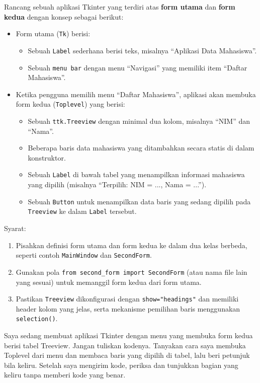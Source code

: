 Rancang sebuah aplikasi Tkinter yang terdiri atas \textbf{form utama} dan \textbf{form kedua} dengan konsep sebagai berikut:
\begin{itemize}
    \item Form utama (\texttt{Tk}) berisi:
          \begin{itemize}
              \item Sebuah \texttt{Label} sederhana berisi teks, misalnya ``Aplikasi Data Mahasiswa''.
              \item Sebuah \texttt{menu bar} dengan menu ``Navigasi'' yang memiliki item ``Daftar Mahasiswa''.
          \end{itemize}
    \item Ketika pengguna memilih menu ``Daftar Mahasiswa'', aplikasi akan membuka form kedua (\texttt{Toplevel}) yang berisi:
          \begin{itemize}
              \item Sebuah \texttt{ttk.Treeview} dengan minimal dua kolom, misalnya ``NIM'' dan ``Nama''.
              \item Beberapa baris data mahasiswa yang ditambahkan secara statis di dalam konstruktor.
              \item Sebuah \texttt{Label} di bawah tabel yang menampilkan informasi mahasiswa yang dipilih (misalnya ``Terpilih: NIM = ..., Nama = ...'').
              \item Sebuah \texttt{Button} untuk menampilkan data baris yang sedang dipilih pada \texttt{Treeview} ke dalam \texttt{Label} tersebut.
          \end{itemize}
\end{itemize}
Syarat:
\begin{enumerate}
    \item Pisahkan definisi form utama dan form kedua ke dalam dua kelas berbeda, seperti contoh \texttt{MainWindow} dan \texttt{SecondForm}.
    \item Gunakan pola \texttt{from second\_form import SecondForm} (atau nama file lain yang sesuai) untuk memanggil form kedua dari form utama.
    \item Pastikan \texttt{Treeview} dikonfigurasi dengan \texttt{show="headings"} dan memiliki header kolom yang jelas, serta mekanisme pemilihan baris menggunakan \texttt{selection()}.
\end{enumerate}

\begin{promptterarah}
Saya sedang membuat aplikasi Tkinter dengan menu yang membuka form kedua berisi tabel Treeview. Jangan tuliskan kodenya. Tanyakan cara saya membuka Toplevel dari menu dan membaca baris yang dipilih di tabel, lalu beri petunjuk bila keliru. Setelah saya mengirim kode, periksa dan tunjukkan bagian yang keliru tanpa memberi kode yang benar.
\end{promptterarah}

